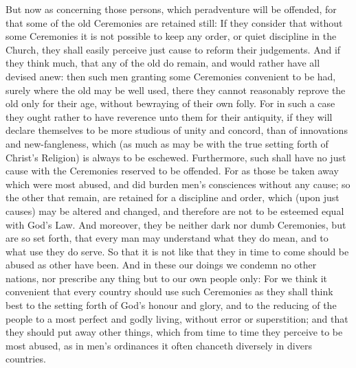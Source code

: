 But now as concerning those persons, which peradventure will be offended, for that some of the old Ceremonies are retained still: If they consider that without some Ceremonies it is not possible to keep any order, or quiet discipline in the Church, they shall easily perceive just cause to reform their judgements. And if they think much, that any of the old do remain, and would rather have all devised anew: then such men granting some Ceremonies convenient to be had, surely where the old may be well used, there they cannot reasonably reprove the old only for their age, without bewraying of their own folly. For in such a case they ought rather to have reverence unto them for their antiquity, if they will declare themselves to be more studious of unity and concord, than of innovations and new-fangleness, which (as much as may be with the true setting forth of Christ's Religion) is always to be eschewed. Furthermore, such shall have no just cause with the Ceremonies reserved to be offended. For as those be taken away which were most abused, and did burden men's consciences without any cause; so the other that remain, are retained for a discipline and order, which (upon just causes) may be altered and changed, and therefore are not to be esteemed equal with God's Law. And moreover, they be neither dark nor dumb Ceremonies, but are so set forth, that every man may understand what they do mean, and to what use they do serve. So that it is not like that they in time to come should be abused as other have been. And in these our doings we condemn no other nations, nor prescribe any thing but to our own people only: For we think it convenient that every country should use such Ceremonies as they shall think best to the setting forth of God's honour and glory, and to the reducing of the people to a most perfect and godly living, without error or superstition; and that they should put away other things, which from time to time they perceive to be most abused, as in men's ordinances it often chanceth diversely in divers countries.

\clearpage
